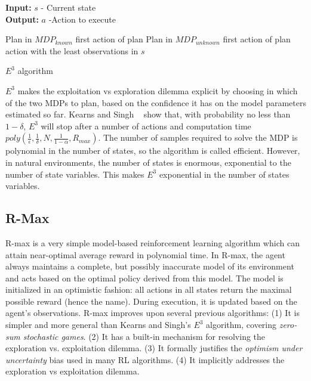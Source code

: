 \begin{algorithm}[H]
\begin{flushleft}
 \textbf{Input:} $s$ - Current state\\
 \textbf{Output:} $a$ -Action to execute
\end{flushleft}
 \begin{algorithmic}
 
 \State Plan in $MDP_{known}$
 \State \Return first action of plan
 \Else
 	 \State Plan in $MDP_{unknown}$
 	 \State \Return first action of plan
 \EndIf
 \Else
 	\State \Return action with the least observations in $s$
 \EndIf
 \end{algorithmic}
 \caption{$E^3$ algorithm}
 \label{alg:e3}
\end{algorithm}
$E^3$ makes the exploitation vs exploration dilemma explicit by choosing in which of the two MDPs to plan, based on the confidence it has on the model parameters estimated so far. Kearns and Singh ~\cite{Kearns:2002:NRL:599616.599699} show that, with probability no less than $1-\delta$, $E^3$ will stop after a number of actions and computation time $poly(\frac{1}{\epsilon},\frac{1}{\delta},N,\frac{1}{1-\alpha},R_{max})$. The number of samples required to solve the MDP is polynomial in the number of states, so the algorithm is called efficient. However, in natural environments, the number of states is enormous, exponential to the number of state variables. This makes $E^3$ exponential in the number of states variables. 
\subsection{R-Max}
R-max is a very simple model-based reinforcement learning algorithm which can attain near-optimal average reward in polynomial time. In R-max, the agent always maintains a complete, but possibly inaccurate model of its environment and acts based on the optimal policy derived from this model. The model is initialized in an optimistic fashion: all actions in all states return the maximal possible reward (hence the name). During execution, it is updated based on the agent's observations.
R-max improves upon several previous algorithms: (1) It is simpler and more general than Kearns and Singh’s $E^3$ algorithm, covering \emph{zero-sum stochastic games}. (2) It has a built-in mechanism for resolving the exploration vs. exploitation dilemma. (3) It formally justifies the \emph{optimism under uncertainty} bias used in many RL algorithms. (4) It implicitly addresses the exploration vs exploitation dilemma.\par
